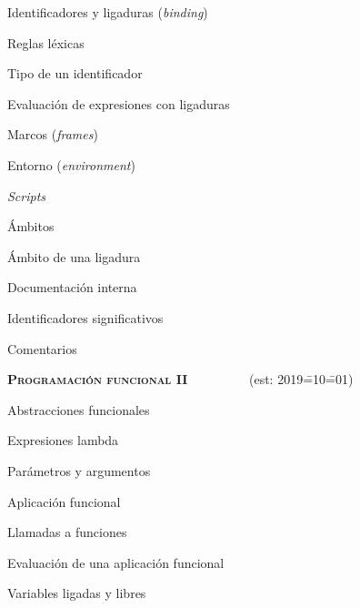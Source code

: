\begin{longenum}
\begin{longenum}
\begin{longenum}
            \item Identificadores y ligaduras (\textit{binding})
            \begin{longenum}
                \item Reglas léxicas
                \item Tipo de un identificador
            \end{longenum}
            \item Evaluación de expresiones con ligaduras
            \item Marcos (\textit{frames})
            \item Entorno (\textit{environment})
            \item \textit{Scripts}
            \item Ámbitos
            \begin{longenum}
                \item Ámbito de una ligadura
            \end{longenum}
        \end{longenum}
        \item Documentación interna
        \begin{longenum}
            \item Identificadores significativos
            \item Comentarios
        \end{longenum}
    \end{longenum}
    \item \textbf{\textsc{Programación funcional II}} \ \ \ \ \ \ \ \ \ (est: 2019\==10\==01)
    \begin{longenum}
        \item Abstracciones funcionales
        \begin{longenum}
            \item Expresiones lambda
            \begin{longenum}
                \item Parámetros y argumentos
                \item Aplicación funcional
                \begin{longenum}
                    \item Llamadas a funciones
                    \item Evaluación de una aplicación funcional
                \end{longenum}
                \item Variables ligadas y libres

\end{longenum}
\end{longenum}
\end{longenum}
\end{longenum}
